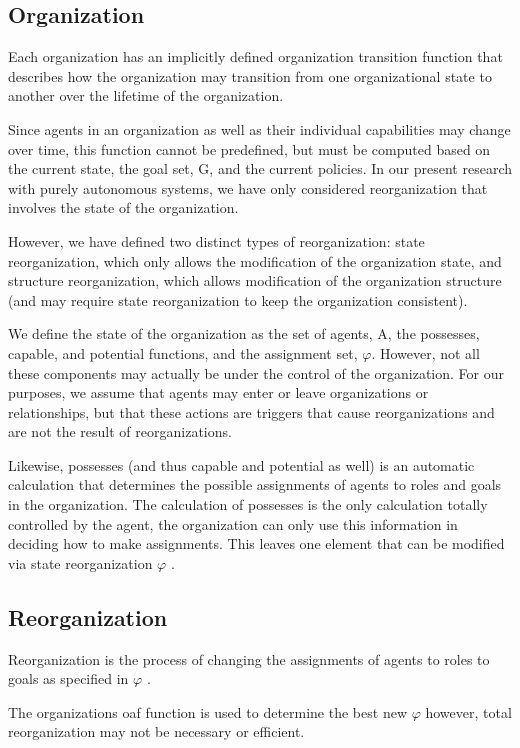 \subsection{Organization}
Each organization has an implicitly defined organization transition function 
that describes how the organization may transition from one organizational state 
to another over the lifetime of the organization\cite{omacs2}.
	
Since agents in an organization as well as their individual capabilities may change over time, 
this function cannot be predefined, but must be computed based on the current state, 
the goal set, G, and the current policies. In our present research with purely autonomous systems, we have only considered reorganization that involves the state of the organization. 

However, we have defined two distinct types of reorganization: state reorganization, which only allows the modification of the organization state, and structure reorganization, which allows modification of the organization structure (and may require state reorganization to keep the organization consistent).

We define the state of the organization as the set of agents, A, the possesses, capable, and potential functions, and the assignment set, $\varphi$. However, not all these components may actually be under the control of the organization. For our purposes, we assume that agents may enter or leave organizations or relationships, but that these actions are triggers that cause reorganizations and are not the result of reorganizations. 

Likewise, possesses (and thus capable and potential as well) is an automatic calculation that determines the possible assignments of agents to roles and goals in the organization. The calculation of possesses is the only calculation totally controlled by the agent, the organization can only use this information in deciding how to make assignments. This leaves one element that can be modified via state reorganization $\varphi$ \cite{omacs2}.
	
\subsection{Reorganization}
Reorganization is the process of changing the assignments of agents to roles to goals as specified
in $\varphi$ \cite{omacs2}.

The organizations oaf function is used to determine the best new $\varphi$ however, total
reorganization may not be necessary or efficient.


